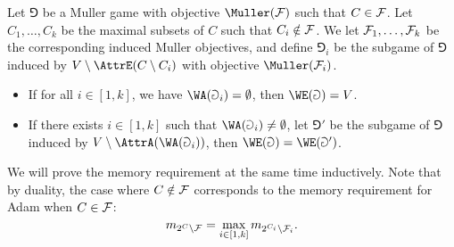 \begin{lemma}
\label{2-lem:McNaughton_Zielonka_even}
Let $\Game$ be a Muller game with objective $\Muller(\F)$ such that $C \in \mathcal{F}$.
Let $C_1, \dots, C_k$ be the maximal subsets of $C$ such that $C_i \notin \mathcal{F}$.
We let $\mathcal{F}_1,\dots,\mathcal{F}_k$ be the corresponding induced Muller objectives,
and define $\Game_i$ be the subgame of $\Game$ induced by $V \setminus \AttrE(C \setminus C_i)$
with objective $\Muller(\F_i)$.
\begin{itemize}
	\item If for all $i \in [1,k]$, we have $\WA(\Game_i) = \emptyset$, then $\WE(\Game) = V$.
	\item If there exists $i \in [1,k]$ such that $\WA(\Game_i) \neq \emptyset$,
	let $\Game'$ be the subgame of $\Game$ induced by $V \setminus \AttrA( \WA(\Game_i) )$,
	then $\WE(\Game) = \WE(\Game')$.
\end{itemize}
\end{lemma}

We will prove the memory requirement at the same time inductively.
Note that by duality, the case where $C \notin \mathcal{F}$ corresponds to the memory requirement for Adam when $C \in \mathcal{F}$:
\[
m_{2^C \setminus \mathcal{F}} = \max_{i \in [1,k]} m_{2^{C_i} \setminus \mathcal{F}_i}.
\]

